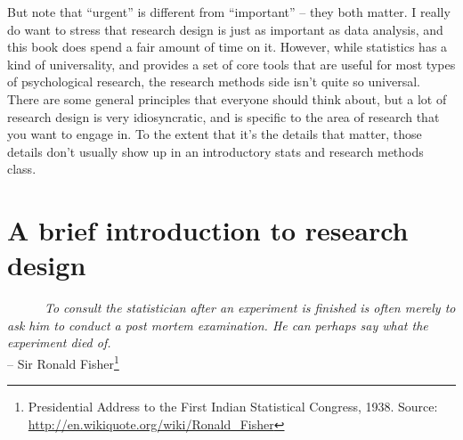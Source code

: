 \documentclass[
]{book}
\begin{document}
But note that ``urgent'' is different from ``important'' -- they both matter. I really do want to stress that research design is just as important as data analysis, and this book does spend a fair amount of time on it. However, while statistics has a kind of universality, and provides a set of core tools that are useful for most types of psychological research, the research methods side isn't quite so universal. There are some general principles that everyone should think about, but a lot of research design is very idiosyncratic, and is specific to the area of research that you want to engage in. To the extent that it's the details that matter, those details don't usually show up in an introductory stats and research methods class.

\hypertarget{studydesign}{%
\chapter{A brief introduction to research design}\label{studydesign}}

~~~~~~\emph{To consult the statistician after an experiment is finished is often merely to ask him to conduct a post mortem examination. He can perhaps say what the experiment died of.}\\
\hspace*{0.333em}\hspace*{0.333em}\hspace*{0.333em}\hspace*{0.333em}\hspace*{0.333em}\hspace*{0.333em}\hspace*{0.333em}\hspace*{0.333em}\hspace*{0.333em}\hspace*{0.333em}\hspace*{0.333em}\hspace*{0.333em}\hspace*{0.333em}\hspace*{0.333em}\hspace*{0.333em}\hspace*{0.333em}\hspace*{0.333em}\hspace*{0.333em}\hspace*{0.333em}\hspace*{0.333em}\hspace*{0.333em}\hspace*{0.333em}\hspace*{0.333em}\hspace*{0.333em}\hspace*{0.333em}\hspace*{0.333em}\hspace*{0.333em}\hspace*{0.333em}\hspace*{0.333em}\hspace*{0.333em}-- Sir Ronald Fisher\footnote{Presidential Address to the First Indian Statistical Congress, 1938. Source: \url{http://en.wikiquote.org/wiki/Ronald_Fisher}}
\end{document}
